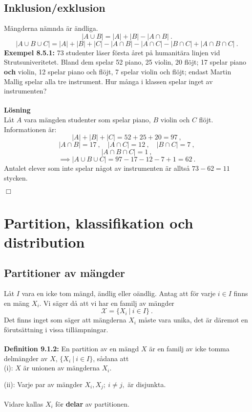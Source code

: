 \documentclass{article}
\begin{document}
\subsection{Inklusion/exklusion}
Mängderna nämnda är ändliga.
$$
|A\cup B|=|A|+|B|-|A\cap B| \ .
$$
$$
|A\cup B\cup C|=|A|+|B|+|C|-|A\cap B|-|A\cap C|-|B\cap C|+|A\cap B\cap C| \ .
$$
\textbf{Exempel 8.5.1:} 73 studenter läser första året på humanitära linjen vid Strutsuniveritetet. Bland dem spelar 52 piano, 25 violin, 20 flöjt; 17 spelar piano \textbf{och} violin, 12 spelar piano och flöjt, 7 spelar violin och flöjt; endast Martin Mallig spelar alla tre instrument. Hur många i klassen spelar inget av instrumenten?\\ \\
\textbf{Lösning}\\
Låt $A$ vara mängden studenter som spelar piano, $B$ violin och $C$ flöjt. Informationen är:
$$
|A|+|B|+|C|=52+25+20=97 \ ,
$$
$$
|A\cap B|=17 \ , \quad |A\cap C|=12 \ , \quad |B\cap C|=7 \ ,
$$
$$
|A\cap B\cap C|=1 \ ,
$$
$$
\implies |A\cup B\cup C|=97-17-12-7+1=62 \ .
$$
Antalet elever som inte spelar något av instrumenten är alltså $73-62=11$ stycken.
\begin{flushright}
$\Box$
\end{flushright}

\section{Partition, klassifikation och distribution}
\subsection{Partitioner av mängder}
Låt $I$ vara en icke tom mängd, ändlig eller oändlig. Antag att för varje $i\in I$ finns en mäng $X_i$. Vi säger då att vi har en familj av mängder
$$
\mathcal{X}=\{X_i \ | \ i\in I\} \ .
$$
Det finns inget som säger att mängderna $X_i$ måste vara unika, det är däremot en förutsättning i vissa tillämpningar.\\ \\
\textbf{Definition 9.1.2:} En partition av en mängd $X$ är en familj av icke tomma delmängder av $X$, $\{X_i \ | \ i\in I\}$, sådana att\\

(i): $X$ är unionen av mängderna $X_i$.

(ii): Varje par av mängder $X_i,X_j; \ i\neq j,$ är disjunkta.\\ \\
Vidare kallas $X_i$ för \textbf{delar} av partitionen.\\
\end{document}

